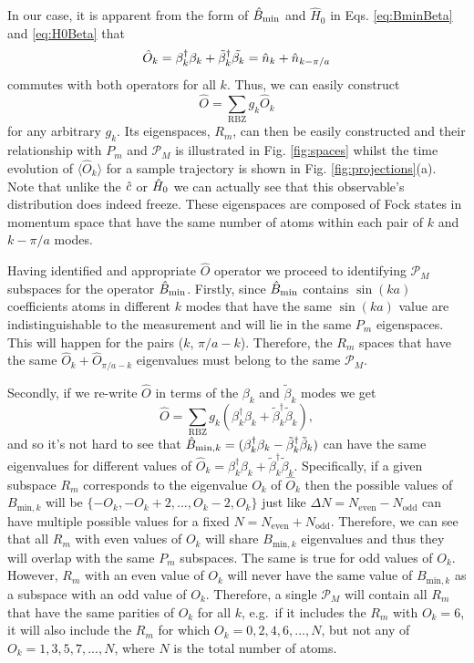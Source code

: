 In our case, it is apparent from the form of $\hat{B}_\mathrm{min}$ and $\hat{H}_0$
in Eqs. \eqref{eq:BminBeta} and \eqref{eq:H0Beta} that
\begin{equation}
\hat{O}_k = \beta_k^\dagger \beta_k + \tilde{\beta}_k^\dagger
\tilde{\beta_k} = \hat{n}_k + \hat{n}_{k - \pi/a}
\end{equation}
commutes with both operators for all $k$. Thus, we can easily
construct 
\begin{equation}
\hat{O} = \sum_\mathrm{RBZ} g_k \hat{O}_k
\end{equation}
for any arbitrary $g_k$. Its eigenspaces, $R_m$, can then be easily
constructed and their relationship with $P_m$ and $\mathcal{P}_M$ is
illustrated in Fig. \ref{fig:spaces} whilst the time evolution of
$\langle \hat{O}_k \rangle$ for a sample trajectory is shown in
Fig. \ref{fig:projections}(a). Note that unlike the $\hat{c}$ or $\hat{H}_0$ we
can actually see that this observable's distribution does indeed
freeze. These eigenspaces are composed of Fock states in momentum
space that have the same number of atoms within each pair of $k$ and
$k - \pi/a$ modes.

Having identified and appropriate $\hat{O}$ operator we proceed to
identifying $\mathcal{P}_M$ subspaces for the operator
$\hat{B}_\mathrm{min}$. Firstly, since $\hat{B}_\mathrm{min}$ contains $\sin(ka)$ coefficients atoms
in different $k$ modes that have the same $\sin(ka)$ value are
indistinguishable to the measurement and will lie in the same $P_m$
eigenspaces. This will happen for the pairs ($k$, $\pi/a -
k$). Therefore, the $R_m$ spaces that have the same
$\hat{O}_k + \hat{O}_{\pi/a - k}$ eigenvalues must belong to the same
$\mathcal{P}_M$.

Secondly, if we re-write $\hat{O}$ in terms of the $\beta_k$ and
$\tilde{\beta}_k$ modes we get
\begin{equation} 
  \hat{O} = \sum_{\mathrm{RBZ}} g_k \left(
    \beta^\dagger_k \beta_k + \tilde{\beta}_k^\dagger \tilde{\beta}_k
  \right),
\end{equation}
and so it's not hard to see that
$\hat{B}_{\mathrm{min},k} = (\beta^\dagger_k \beta_k -
\tilde{\beta}_k^\dagger \tilde{\beta}_k)$ can have the same
eigenvalues for different values of
$\hat{O}_k = \beta^\dagger_k \beta_k + \tilde{\beta}_k^\dagger
\tilde{\beta}_k$. Specifically, if a given subspace $R_m$ corresponds
to the eigenvalue $O_k$ of $\hat{O}_k$ then the possible values of
$B_{\mathrm{min},k}$ will be $\{-O_k, -O_k + 2, ..., O_k - 2, O_k\}$
just like $\Delta N = N_\mathrm{even} - N_\mathrm{odd}$ can have
multiple possible values for a fixed
$N = N_\mathrm{even} + N_\mathrm{odd}$. Therefore, we can see that all
$R_m$ with even values of $O_k$ will share $B_{\mathrm{min},k}$
eigenvalues and thus they will overlap with the same $P_m$
subspaces. The same is true for odd values of $O_k$. However, $R_m$
with an even value of $O_k$ will never have the same value of
$B_{\mathrm{min},k}$ as a subspace with an odd value of
$O_k$. Therefore, a single $\mathcal{P}_M$ will contain all $R_m$ that
have the same parities of $O_k$ for all $k$, e.g.~if it includes the
$R_m$ with $O_k = 6$, it will also include the $R_m$ for which
$O_k = 0, 2, 4, 6, ..., N$, but not any of $O_k = 1, 3, 5, 7, ..., N$,
where $N$ is the total number of atoms.

